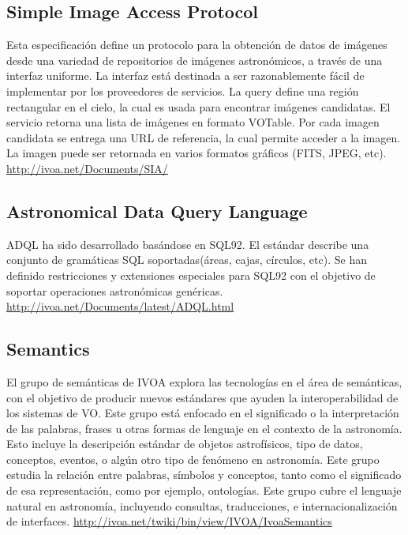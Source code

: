 \subsection{Simple Image Access Protocol}


Esta especificación define un protocolo para la obtención de datos de imágenes
desde una variedad de repositorios de imágenes astronómicos, a través de una
interfaz uniforme. La interfaz está destinada a ser razonablemente fácil de
implementar por los proveedores de servicios. La query define una región
rectangular en el cielo, la cual es usada para encontrar imágenes candidatas.
El servicio retorna una lista de imágenes en formato VOTable. Por cada imagen
candidata se entrega una URL de referencia, la cual permite acceder a la
imagen. La imagen puede ser retornada en varios formatos gráficos (FITS, JPEG,
etc). \url{http://ivoa.net/Documents/SIA/}

\subsection{Astronomical Data Query Language}


ADQL ha sido desarrollado basándose en SQL92. El estándar describe una conjunto
de gramáticas SQL soportadas(áreas, cajas, círculos, etc). Se han definido
restricciones y extensiones especiales para SQL92 con el objetivo de soportar
operaciones astronómicas genéricas.
\url{http://ivoa.net/Documents/latest/ADQL.html}

\subsection{Semantics}


El grupo de semánticas de IVOA explora las tecnologías en el área de
semánticas, con el objetivo de producir nuevos estándares que ayuden la
interoperabilidad de los sistemas de VO. Este grupo está enfocado en el
significado o la interpretación de las palabras, frases u otras formas de
lenguaje en el contexto de la astronomía. Esto incluye la descripción estándar
de objetos astrofísicos, tipo de datos, conceptos, eventos, o algún otro tipo
de fenómeno en astronomía. Este grupo estudia la relación entre palabras,
símbolos y conceptos, tanto como el significado de esa representación, como por
ejemplo, ontologías. Este grupo cubre el lenguaje natural en astronomía,
incluyendo consultas, traducciones, e internacionalización de interfaces.
\url{http://ivoa.net/twiki/bin/view/IVOA/IvoaSemantics}

